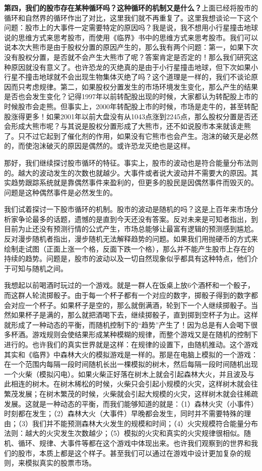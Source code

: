 \textbf{第四，我们的股市存在某种循环吗？这种循环的机制又是什么？}上面已经将股市的循环和自然界的循环作出了对比，这里我们就不再重复了。这里我想谈论一下这个问题：股市上的大事件一定需要特定的原因吗？我是说，我不想用小行星撞击地球说的思维方式来思考股市，而使用《临界》书中的思维方式来思考股市。我们可以说本次大熊市是由于股权分置的原因产生的，那么我有两个问题：第一，如果下次没有股权分置，是否就不会产生大熊市了呢？答案肯定是否定的！那么我们研究这种原因就没有意义了。也许恐龙的灭绝真的是由于小行星撞击地球，但下次如果小行星不撞击地球就不会出现生物集体灭绝了吗？这个道理是一样的，我们不谈论原因而只考虑规律。第二，如果股权分置发生的市场环境发生变化，那么产生的结果是否也会发生变化？记得1997年以前转配股出现的时候，大家都认为转配股上市的时候股市会走熊。但事实上，2000年转配股上市的时候，市场是走牛的，甚至转配股涨得更多！如果2001年以前大盘没有从1043点涨到2245点，那么股权分置是否还会形成大熊市呢？与其说是股权分置形成了大熊市，还不如说股市本来就该走熊了。只不过它起到了催化剂的作用，如果没有它熊市也会产生。泡沫的破灭是必然的，而使泡沫破灭的原因是偶然的。或许恐龙灭绝也是这样。

那好，我们继续探讨股市循环的特征。事实上，股市的波动也是符合能量分布法则的。越大的波动发生的次数也就越少。大事件或者说大波动并不需要大的原因。其实趋势跟踪系统就是靠偶然事件来盈利的，但更多的股民是因偶然事件而毁灭的。问题是这种偶然事件是必然发生的。

我们试着探讨一下股市循环的机制。股市的波动是随机的吗？这是上百年来市场分析家争论最多的话题，遗憾的是直到今天还没有答案。反对未来是可知者指出，到目前为止还没有预测行情的公式产生，市场总能够让最富有逻辑的预测感到尴尬。反对漫步随机者指出，漫步随机无法解释趋势的问题。如果我们用抛硬币的方式来绘制走试图（正面上涨一个格，反面下跌一个格），那么并不能产生股市上存在的持续的趋势。问题是，股市的波动以及一切自然现象似乎都具有这种特点，他们介于可知与随机之间。

我想起以前喝酒时玩过的一个游戏。就是一群人在饭桌上放6个酒杯和一个骰子，而这群人轮流掷骰子。由于每一个杯子都有一个对应的数字，掷骰子得到的数字都会对应一个杯子。如果杯子是空的，那么就倒满酒，轮到下一个人继续掷骰子。当然如果杯子是满的，那么就把酒喝下去，继续掷骰子，直到掷到空杯子为止。这样就形成了一种动态的平衡，而随机控制下的“趋势”产生了！因为总是有人会喝下很多杯酒。游戏规则会使结果形成某种模糊的规律，而整个游戏又是在随机的控制下进行的。也许我们的真实世界就是这样：在规律的设置下，由随机推动。这个游戏其实和《临界》中森林大火的模拟游戏是一样的。那是在电脑上模拟的一个游戏：在一个范围内每隔一段时间随机长出一棵模拟的树木，然后每隔一段时间随机出现一个火柴（模拟闪电）。如果火柴正好落在树木上就会引起森林大火，并且波及与此相连的树木。在树木稀松的时候，火柴只会引起小规模的火灾，这样树木就会往繁茂发展；在树木繁茂的时候，火柴就会引起大规模的火灾，这样树木就会往稀疏发展。这就是一种动态的平衡，而我们能够知道的就是：（1）森林火灾（小事件）时刻都在发生；（2）森林大火（大事件）早晚都会发生，同时并不需要特殊的理由；（3）我们并不能预测森林大火发生的规模和时间；（4）火灾规模符合能量分布法则：越大的火灾发生次数越少；（5）模拟的火灾和真实的火灾规律很相似。随机、循环、规律、大事件等都在这个游戏中体现出来。也许我们观察到的世界和我们的股市，本质上都是这个样子。甚至我们可以通过在游戏中设计更加复杂的规则，来模拟真实的股票市场。

